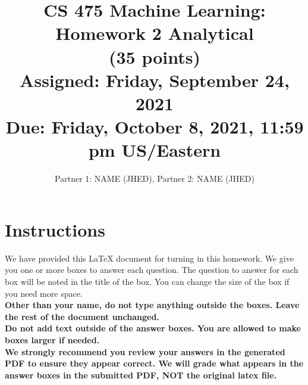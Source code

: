 \documentclass[11pt]{article}
\title{CS 475 Machine Learning: Homework 2 Analytical \\
(35 points)\\
\Large{Assigned: Friday, September 24, 2021} \\
\Large{Due: Friday, October 8, 2021, 11:59 pm US/Eastern}}
\author{Partner 1: NAME (JHED), Partner 2:  NAME (JHED)}
\date{}
\renewcommand{\vec}[1]{\mathbf{#1}}
\begin{document}
\maketitle
\thispagestyle{headings}

\section*{Instructions }
We have provided this \LaTeX{} document for turning in this homework. We give you one or more boxes to answer each question.  The question to answer for each box will be noted in the title of the box.  You can change the size of the box if you need more space.\\

{\bf Other than your name, do not type anything outside the boxes. Leave the rest of the document unchanged.}\\


\textbf{
  Do
  not add text outside of the answer boxes.  You are allowed to make boxes larger if needed.
  }\\


\textbf{We strongly recommend you review your answers in the generated PDF to
  ensure they appear correct. We will grade what appears in the answer boxes in
  the submitted PDF, NOT the original latex file.}

\end{document}
